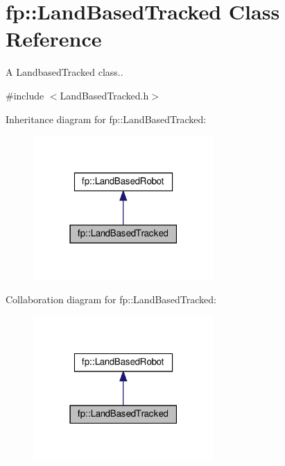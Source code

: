 \hypertarget{classfp_1_1_land_based_tracked}{}\section{fp\+:\+:Land\+Based\+Tracked Class Reference}
\label{classfp_1_1_land_based_tracked}


A Landbased\+Tracked class..  




{\ttfamily \#include $<$Land\+Based\+Tracked.\+h$>$}



Inheritance diagram for fp\+:\+:Land\+Based\+Tracked\+:
\nopagebreak
\begin{figure}[H]
\begin{center}
\leavevmode
\includegraphics[width=195pt]{classfp_1_1_land_based_tracked__inherit__graph}
\end{center}
\end{figure}


Collaboration diagram for fp\+:\+:Land\+Based\+Tracked\+:
\nopagebreak
\begin{figure}[H]
\begin{center}
\leavevmode
\includegraphics[width=195pt]{classfp_1_1_land_based_tracked__coll__graph}
\end{center}
\end{figure}
